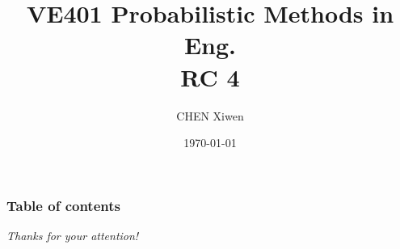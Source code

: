 \documentclass[11pt, hyperref={pdfpagelabels=true}]{beamer}
\title{VE401 Probabilistic Methods in Eng. \\RC 4}
\author{CHEN Xiwen}
\date{\today}
\institute[UM-JI]{UM-SJTU Joint Institute}
\begin{document}
\begin{frame}
\titlepage
\end{frame} 


\begin{frame}
\frametitle{Table of contents}
\tableofcontents
\end{frame} 



\begin{frame}{}

\centering
\emph{Thanks for your attention!}
  
  
\end{frame}
\end{document}
